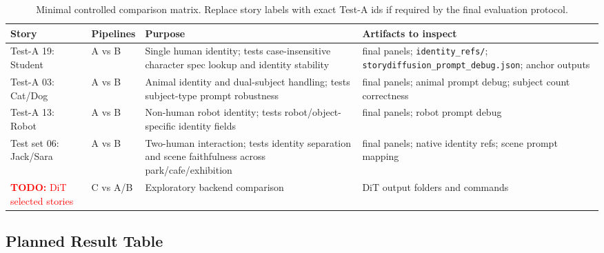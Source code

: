 \documentclass[11pt,a4paper]{article}
\newcommand{\todo}[1]{\textcolor{red}{\textbf{TODO:} #1}}
\begin{document}
\begin{table}[H]
\centering
\small
\begin{tabularx}{\textwidth}{p{} p{} X X}
\toprule
\textbf{Story} & \textbf{Pipelines} & \textbf{Purpose} & \textbf{Artifacts to inspect} \\
\midrule
Test-A 19: Student & A vs B & Single human identity; tests case-insensitive character spec lookup and identity stability & final panels; \texttt{identity\_refs/}; \texttt{storydiffusion\_prompt\_debug.json}; anchor outputs \\
\midrule
Test-A 03: Cat/Dog & A vs B & Animal identity and dual-subject handling; tests subject-type prompt robustness & final panels; animal prompt debug; subject count correctness \\
\midrule
Test-A 13: Robot & A vs B & Non-human robot identity; tests robot/object-specific identity fields & final panels; robot prompt debug \\
\midrule
Test set 06: Jack/Sara & A vs B & Two-human interaction; tests identity separation and scene faithfulness across park/cafe/exhibition & final panels; native identity refs; scene prompt mapping \\
\midrule
\todo{DiT selected stories} & C vs A/B & Exploratory backend comparison & DiT output folders and commands \\
\bottomrule
\end{tabularx}
\caption{Minimal controlled comparison matrix. Replace story labels with exact Test-A ids if required by the final evaluation protocol.}
\label{tab:controlled_comparisons}
\end{table}

\subsection{Planned Result Table}
\end{document}
